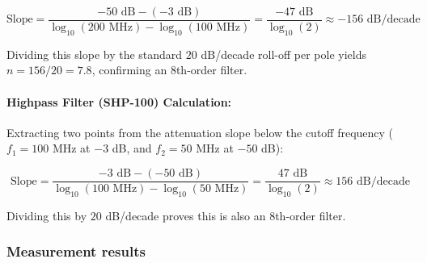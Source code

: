 \begin{equation}
    \text{Slope} = \frac{-50\text{ dB} - (-3\text{ dB})}{\log_{10}(200\text{ MHz}) - \log_{10}(100\text{ MHz})} = \frac{-47\text{ dB}}{\log_{10}(2)} \approx -156\text{ dB/decade}
\end{equation}

Dividing this slope by the standard $20$ dB/decade roll-off per pole yields $n = 156 / 20 = 7.8$, confirming an 8th-order filter.

\paragraph{Highpass Filter (SHP-100) Calculation:}
Extracting two points from the attenuation slope below the cutoff frequency ($f_1 = 100$ MHz at $-3$ dB, and $f_2 = 50$ MHz at $-50$ dB):

\begin{equation}
    \text{Slope} = \frac{-3\text{ dB} - (-50\text{ dB})}{\log_{10}(100\text{ MHz}) - \log_{10}(50\text{ MHz})} = \frac{47\text{ dB}}{\log_{10}(2)} \approx 156\text{ dB/decade}
\end{equation}

Dividing this by $20$ dB/decade proves this is also an 8th-order filter.

\subsubsection{Measurement results}

